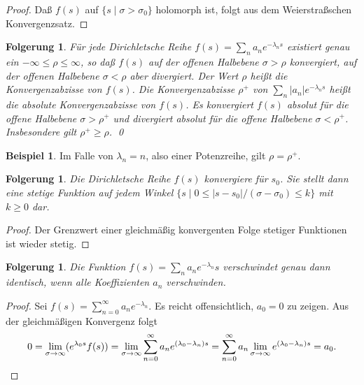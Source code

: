 \documentclass[a4paper,twoside,openright]{report}
\newtheorem{cor}[thm]{Folgerung}
\theoremstyle{definition}
\newtheorem{xca}[thm]{Beispiel}
\theoremstyle{remark}
\begin{document}
\begin{proof}
  Daß $f(s)$ auf $\{s \mid \sigma > \sigma_0\}$ holomorph ist, folgt aus dem
  Weierstraßschen Konvergenzsatz.
\end{proof}

\begin{cor}
  Für jede Dirichletsche Reihe $f(s) = \sum_n a_n e^{-\lambda_n s}$ existiert genau ein $-\infty \leq \rho \leq \infty$, so daß
  $f(s)$ auf der offenen Halbebene $\sigma > \rho$ konvergiert, auf der offenen Halbebene $\sigma < \rho$ aber divergiert. Der Wert
  $\rho$ heißt die \emph{Konvergenzabzisse von $f(s)$}. Die Konvergenzabzisse $\rho^+$ von $\sum_n |a_n| e^{-\lambda_n s}$ heißt die
  \emph{absolute Konvergenzabzisse von $f(s)$}. Es konvergiert $f(s)$ absolut für die offene Halbebene $\sigma > \rho^+$ und divergiert absolut für die
  offene Halbebene $\sigma < \rho^+$. Insbesondere gilt $\rho^+ \ge \rho$.
  \qed
\end{cor}

\begin{xca}
  Im Falle von $\lambda_n = n$, also einer Potenzreihe, gilt $\rho = \rho^+$.
\end{xca}

\begin{cor}
  Die Dirichletsche Reihe $f(s)$ konvergiere für $s_0$. Sie stellt dann eine stetige Funktion auf jedem Winkel
  $\{s \mid 0 \leq |s - s_0|/(\sigma - \sigma_0) \leq k\}$ mit $k \ge 0$ dar.
\end{cor}

\begin{proof}
  Der Grenzwert einer gleichmäßig konvergenten Folge stetiger Funktionen ist
  wieder stetig.
\end{proof}

\begin{cor}
  Die Funktion $f(s) = \sum_n a_n e^{-\lambda_n} s$ verschwindet
  genau dann identisch, wenn alle Koeffizienten $a_n$ verschwinden. 
\end{cor}

\begin{proof}
  Sei $f(s) = \sum_{n = 0}^\infty a_n e^{-\lambda_n}$. Es reicht offensichtlich,
  $a_0 = 0$ zu zeigen. Aus der gleichmäßigen Konvergenz folgt
  \[
    0 = \lim_{\sigma \to \infty} (e^{\lambda_0 s} f(s))
    = \lim_{\sigma \to \infty} \sum_{n = 0}^\infty a_n e^{(\lambda_0 - \lambda_n) s}
    = \sum_{n = 0}^\infty a_n \lim_{\sigma \to \infty} e^{(\lambda_0 - \lambda_n) s}
    = a_0.
    \qedhere
  \]
\end{proof}
\end{document}
